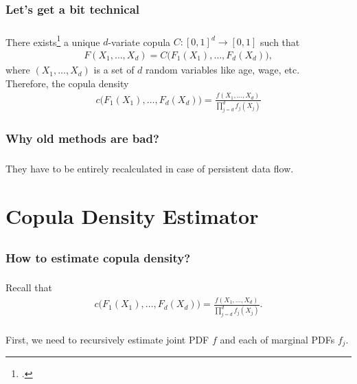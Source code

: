 \documentclass[aspectratio=169]{beamer}
\begin{document}
		\subsubsection{Let's get a bit technical}
			\begin{frame}
				\frametitle{\insertsubsubsection}
				
				 There exists\footcite{Sklar1959} a unique $ d $-variate copula $ C: [0, 1]^d \rightarrow [0, 1] $ such that
				\begin{align}
					F(X_1, \dots, X_d) = C\big(F_1(X_1), \dots, F_d(X_d)\big),
				\end{align}
				where $ (X_1, \dots, X_d) $ is a set of $ d $ random variables like age, wage, etc.\\[1em]
				
				\onslide<2-> Therefore, the copula density 
				\begin{align}
					c\big(F_1(X_1), \dots, F_d(X_d)\big) = \frac{f(X_1, \dots, X_d)}{\prod_{j=d}^{d}f_j(X_j)}
				\end{align}
				
			\end{frame}
			
		\subsubsection{Why old methods are bad?}
			\begin{frame}
				\frametitle{\insertsubsubsection}
				
				They have to be entirely recalculated in case of persistent data flow.
				
			\end{frame}
	
\section{Copula Density Estimator}
	\subsection{}
		\subsubsection{How to estimate copula density?}
			\begin{frame}
				\frametitle{\insertsubsubsection}
				
				Recall that
				\begin{align}
					c\big(F_1(X_1), \dots, F_d(X_d)\big) = \frac{f(X_1, \dots, X_d)}{\prod_{j=d}^{d}f_j(X_j)}.
				\end{align}
				\\[1em]
				First, we need to recursively estimate joint PDF $ f $ and each of marginal PDFs $ f_j $.
				
			\end{frame}			
			
\end{document}
